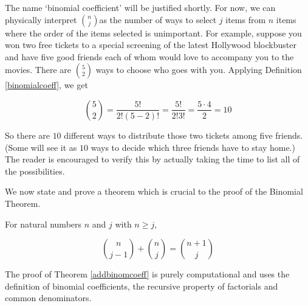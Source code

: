 \documentclass{ximera}
\begin{document}
\smallskip
 
The name `binomial coefficient' will be justified shortly.  For now, we can physically interpret $\binom{n}{j}$as the number of ways to select $j$ items from $n$ items where the order of the items selected is unimportant.   For example, suppose you won two free tickets to a special screening of the latest Hollywood blockbuster and have five good friends each of whom would love to accompany you to the movies.  There are $\binom{5}{2}$ ways to choose who goes with you.  Applying Definition \ref{binomialcoeff}, we get

\[ \binom{5}{2} = \dfrac{5!}{2! (5-2)!} = \dfrac{5!}{2! 3!} = \dfrac{5 \cdot 4}{2} = 10\] 

So there are $10$ different ways to distribute those two tickets among five friends. (Some will see it as $10$ ways to decide which three friends have to stay home.)  The reader is encouraged to verify this by actually taking the time to list all of the possibilities.  

\smallskip



We now state and prove a theorem which is crucial to the proof of the Binomial Theorem.

\smallskip

\colorbox{ResultColor}{\bbm

\begin{thm}  \label{addbinomcoeff}  For natural numbers $n$ and $j$ with $n \geq j$, 

\[ \binom{n}{j-1} + \binom{n}{j} = \binom{n+1}{j} \]



\end{thm}

\ebm}

\smallskip

The proof of Theorem \ref{addbinomcoeff} is purely computational and uses the definition of binomial coefficients, the recursive property of factorials and common denominators.
\end{document}

